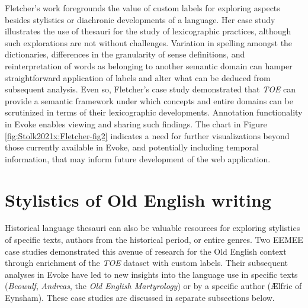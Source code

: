 Fletcher's work foregrounds the value of custom labels for exploring aspects besides stylistics or diachronic developments of a language. 
Her case study illustrates the use of thesauri for the study of lexicographic practices, although such explorations are not without challenges. Variation in spelling amongst the dictionaries, differences in the granularity of sense definitions, and reinterpretation of words as belonging to another semantic domain %
can hamper straightforward application of labels and alter what can be deduced from subsequent analysis. Even so, Fletcher's case study demonstrated that \textit{TOE} can provide a semantic framework under which concepts and entire domains can be scrutinized in terms of their lexicographic developments. Annotation functionality in Evoke enables viewing and sharing such findings. The chart in Figure \ref{fig:Stolk2021x:Fletcher-fig2} indicates a need for further visualizations beyond those currently available in Evoke, and potentially including temporal information, that may inform future development of the web application. %

\section{Stylistics of Old English writing}
\label{sect:Stolk2021x:cs-stylistics}

Historical language thesauri can also be valuable resources for exploring stylistics of specific texts, authors from the historical period, or entire genres. Two EEMEE case studies demonstrated this avenue of research for the Old English context through enrichment of the \textit{TOE} dataset with custom labels. Their subsequent analyses in Evoke have led to new insights into the language use in specific texts (\textit{Beowulf}, \textit{Andreas}, the \textit{Old English Martyrology}) or by a specific author (Ælfric of Eynsham). These case studies are discussed in separate subsections below.

